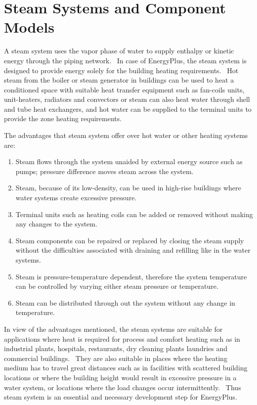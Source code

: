 \section{Steam Systems and Component Models}\label{steam-systems-and-component-models}

A steam system uses the vapor phase of water to supply enthalpy or kinetic energy through the piping network.~ In case of EnergyPlus, the steam system is designed to provide energy solely for the building heating requirements.~ Hot steam from the boiler or steam generator in buildings can be used to heat a conditioned space with suitable heat transfer equipment such as fan-coils units, unit-heaters, radiators and convectors or steam can also heat water through shell and tube heat exchangers, and hot water can be supplied to the terminal units to provide the zone heating requirements.

The advantages that steam system offer over hot water or other heating systems are:

\begin{enumerate}
\def\labelenumi{\arabic{enumi}.}
\item
  Steam flows through the system unaided by external energy source such as pumps; pressure difference moves steam across the system.
\item
  Steam, because of its low-density, can be used in high-rise buildings where water systems create excessive pressure.
\item
  Terminal units such as heating coils can be added or removed without making any changes to the system.
\item
  Steam components can be repaired or replaced by closing the steam supply without the difficulties associated with draining and refilling like in the water systems.
\item
  Steam is pressure-temperature dependent, therefore the system temperature can be controlled by varying either steam pressure or temperature.
\item
  Steam can be distributed through out the system without any change in temperature.
\end{enumerate}

In view of the advantages mentioned, the steam systems are suitable for applications where heat is required for process and comfort heating such as in industrial plants, hospitals, restaurants, dry cleaning plants laundries and commercial buildings.~ They are also suitable in places where the heating medium has to travel great distances such as in facilities with scattered building locations or where the building height would result in excessive pressure in a water system, or locations where the load changes occur intermittently.~ Thus steam system is an essential and necessary development step for EnergyPlus.

